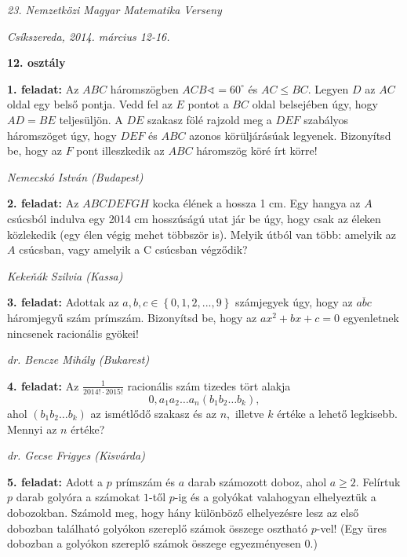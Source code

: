 \documentclass[a4paper,10pt]{article}
\newcommand{\ki}[2]{\hfill {\it #1 (#2)}\medskip}
\begin{document}
\begin{center} \Large {\em 23. Nemzetközi Magyar Matematika Verseny} \end{center}
\begin{center} \large{\em Csíkszereda, 2014. március 12-16.} \end{center}
\smallskip
\begin{center} \large{\bf 12. osztály} \end{center}
\bigskip

{\bf 1. feladat: } Az $ABC$ háromszögben $ACB\sphericalangle = 60^\circ$ és $AC\le
BC$. Legyen $D$ az $AC$ oldal egy belső pontja. Vedd fel az $E$
pontot a $BC$ oldal belsejében úgy, hogy $AD = BE$
teljesüljön. A $DE$ szakasz fölé rajzold meg a $DEF$
szabályos háromszöget úgy, hogy $DEF$ és $ABC$ azonos
körüljárásúak legyenek. Bizonyítsd be, hogy az $F$ pont
illeszkedik az $ABC$ háromszög köré írt körre!


\ki{Nemecskó István}{Budapest}\medskip

{\bf 2. feladat: } Az $ABCDEFGH$ kocka élének a hossza 1 cm. Egy hangya az $A$
csúcsból indulva egy 2014 cm hosszúságú utat jár be
úgy, hogy csak az éleken közlekedik (egy élen végig mehet
többször is). Melyik útból van több: amelyik az $A$
csúcsban, vagy amelyik a C csúcsban végződik?


\ki{Keke\v{n}ák Szilvia}{Kassa}\medskip

{\bf 3. feladat: } Adottak az $a,b,c \in \left\{ {0,1,2,...,9} \right\}$ számjegyek
úgy, hogy az $\overline {abc} $ háromjegyű szám prímszám.
Bizonyítsd be, hogy az $a{x^2} + bx + c = 0$ egyenletnek nincsenek
racionális gyökei!


\ki{dr. Bencze Mihály}{Bukarest}\medskip

{\bf 4. feladat: } Az $\displaystyle\frac{1}{2014!\cdot 2015!}$ racionális szám
tizedes tört alakja $$0,a_1a_2\ldots a_n(b_1b_2\ldots b_k),$$ ahol
$(b_1b_2\ldots b_k)$ az ismétlődő szakasz és az $n,$
illetve $k$ értéke a lehető legkisebb. Mennyi az $n$
értéke?

\ki{dr. Gecse Frigyes}{Kisvárda}\medskip

{\bf 5. feladat: } Adott a $p$ prímszám és $a$ darab számozott doboz, ahol
$a\ge 2.$ Felírtuk $p$ darab golyóra a számokat $1$-től
$p$-ig és a golyókat valahogyan elhelyeztük a dobozokban.
Számold meg, hogy hány különböző elhelyezésre lesz az
első dobozban található golyókon szereplő számok
összege osztható $p$-vel! (Egy üres dobozban a golyókon
szereplő számok összege egyezményesen $0.$)
\end{document}
